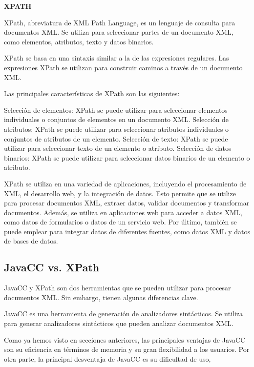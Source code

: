 \phantom{text}

\noindent \textbf{XPATH}

\phantom{text}

XPath, abreviatura de XML Path Language, es un lenguaje de consulta para documentos XML. Se utiliza para seleccionar partes de un documento XML, como elementos, atributos, texto y datos binarios.

XPath se basa en una sintaxis similar a la de las expresiones regulares. Las expresiones XPath se utilizan para construir caminos a través de un documento XML.

Las principales características de XPath son las siguientes:

Selección de elementos: XPath se puede utilizar para seleccionar elementos individuales o conjuntos de elementos en un documento XML.
Selección de atributos: XPath se puede utilizar para seleccionar atributos individuales o conjuntos de atributos de un elemento.
Selección de texto: XPath se puede utilizar para seleccionar texto de un elemento o atributo.
Selección de datos binarios: XPath se puede utilizar para seleccionar datos binarios de un elemento o atributo.

XPath se utiliza en una variedad de aplicaciones, incluyendo el procesamiento de XML, el desarrollo web, y la integración de datos. Esto permite que se utilize para procesar documentos XML, extraer datos, validar documentos y transformar documentos. Además, se utiliza en aplicaciones web para acceder a datos XML, como datos de formularios o datos de un servicio web. Por último, también se puede emplear para integrar datos de diferentes fuentes, como datos XML y datos de bases de datos.


\subsection{JavaCC vs. XPath}

\noindent JavaCC y XPath son dos herramientas que se pueden utilizar para procesar documentos XML. Sin embargo, tienen algunas diferencias clave.

JavaCC es una herramienta de generación de analizadores sintácticos. Se utiliza para generar analizadores sintácticos que pueden analizar documentos XML.

Como ya hemos visto en secciones anteriores, las principales ventajas de JavaCC son su eficiencia en términos de memoria y su gran flexibilidad a los usuarios. Por otra parte, la principal desventaja de JavaCC es su dificultad de uso,

